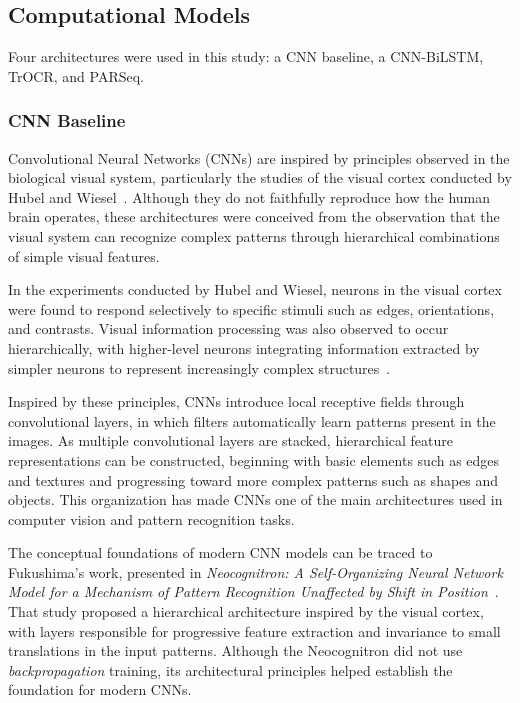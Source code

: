 \documentclass[11pt,a4paper]{article}
\begin{document}
\subsection{Computational Models}
\label{sec:models}

Four architectures were used in this study: a CNN baseline, a CNN-BiLSTM, TrOCR, and PARSeq.

\subsubsection{CNN Baseline}



Convolutional Neural Networks (CNNs) are inspired by principles observed in the biological visual system, particularly the studies of the visual cortex conducted by Hubel and Wiesel~\cite{hubel1962receptive}. Although they do not faithfully reproduce how the human brain operates, these architectures were conceived from the observation that the visual system can recognize complex patterns through hierarchical combinations of simple visual features.

In the experiments conducted by Hubel and Wiesel, neurons in the visual cortex were found to respond selectively to specific stimuli such as edges, orientations, and contrasts. Visual information processing was also observed to occur hierarchically, with higher-level neurons integrating information extracted by simpler neurons to represent increasingly complex structures~\cite{hubel1962receptive}.

Inspired by these principles, CNNs introduce local receptive fields through convolutional layers, in which filters automatically learn patterns present in the images. As multiple convolutional layers are stacked, hierarchical feature representations can be constructed, beginning with basic elements such as edges and textures and progressing toward more complex patterns such as shapes and objects. This organization has made CNNs one of the main architectures used in computer vision and pattern recognition tasks.


The conceptual foundations of modern CNN models can be traced to Fukushima's work, presented in \textit{Neocognitron: A Self-Organizing Neural Network Model for a Mechanism of Pattern Recognition Unaffected by Shift in Position}~\cite{fukushima1980neocognitron}. That study proposed a hierarchical architecture inspired by the visual cortex, with layers responsible for progressive feature extraction and invariance to small translations in the input patterns. Although the Neocognitron did not use \textit{backpropagation} training, its architectural principles helped establish the foundation for modern CNNs.
\end{document}
